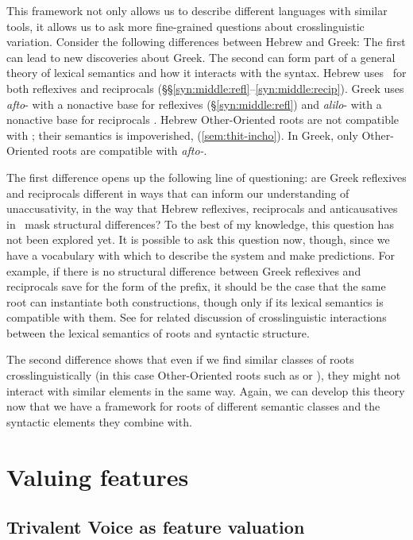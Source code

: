 This framework not only allows us to describe different languages with similar tools, it allows us to ask more fine-grained questions about crosslinguistic variation. Consider the following differences between Hebrew and Greek: The first can lead to new discoveries about Greek. The second can form part of a general theory of lexical semantics and how it interacts with the syntax.
\pex
	\a Hebrew uses \thit~for both reflexives and reciprocals (\S\S\ref{syn:middle:refl}--\ref{syn:middle:recip}). Greek uses \emph{afto}- with a nonactive base for reflexives (\S\ref{syn:middle:refl}) and \emph{alilo}- with a nonactive base for reciprocals \citep{alexiadouafto}.
	\a Hebrew Other-Oriented roots are not compatible with \va; their semantics is impoverished, (\ref{sem:thit-incho}). In Greek, only Other-Oriented roots are compatible with \emph{afto-}.
\xe

The first difference opens up the following line of questioning: are Greek reflexives and reciprocals different in ways that can inform our understanding of unaccusativity, in the way that Hebrew reflexives, reciprocals and anticausatives in \thit~mask structural differences? To the best of my knowledge, this question has not been explored yet. It is possible to ask this question now, though, since we have a vocabulary with which to describe the system and make predictions. For example, if there is no structural difference between Greek reflexives and reciprocals save for the form of the prefix, it should be the case that the same root can instantiate both constructions, though only if its lexical semantics is compatible with them. See \cite{alexiadouborerschaefer14} for related discussion of crosslinguistic interactions between the lexical semantics of roots and syntactic structure.

The second difference shows that even if we find similar classes of roots crosslinguistically (in this case Other-Oriented roots such as  or ), they might not interact with similar elements in the same way. Again, we can develop this theory now that we have a framework for roots of different semantic classes and the syntactic elements they combine with.



\section{Valuing features} \label{i:agree}

	\subsection{Trivalent Voice as feature valuation} \label{i:agree:nie}

